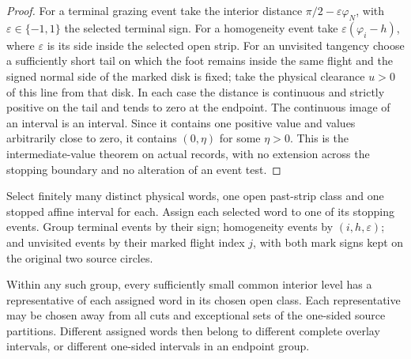 \begin{proof}
For a terminal grazing event take the interior distance
$\pi/2-\varepsilon\varphi_N$, with
$\varepsilon\in\{-1,1\}$ the selected terminal sign.
For a homogeneity event take
$\varepsilon(\varphi_i-h)$, where $\varepsilon$ is its side inside
the selected open strip.
For an unvisited tangency choose a sufficiently short tail on
which the foot remains inside the same flight and the signed
normal side of the marked disk is fixed; take the physical
clearance $u>0$ of this line from that disk.
In each case the distance is continuous and strictly positive on
the tail and tends to zero at the endpoint.  The continuous image
of an interval is an interval.  Since it contains one positive
value and values arbitrarily close to zero, it contains
$(0,\eta)$ for some $\eta>0$.
This is the intermediate-value theorem on actual records, with no
extension across the stopping boundary and no alteration of an
event test.
\end{proof}

\begin{lemma}
\label{ps:common-level}
Select finitely many distinct physical words, one open past-strip
class and one stopped affine interval for each.  Assign each selected
word to one of its stopping events.  Group terminal events by their
sign; homogeneity events by $(i,h,\varepsilon)$; and unvisited
events by their marked flight index $j$, with both mark signs kept
on the original two source circles.

Within any such group, every sufficiently small common interior
level has a representative of each assigned word in its chosen
open class.  Each representative may be chosen away from all cuts
and exceptional sets of the one-sided source partitions.
Different assigned words then belong to different complete
overlay intervals, or different one-sided intervals in an
endpoint group.
\end{lemma}

